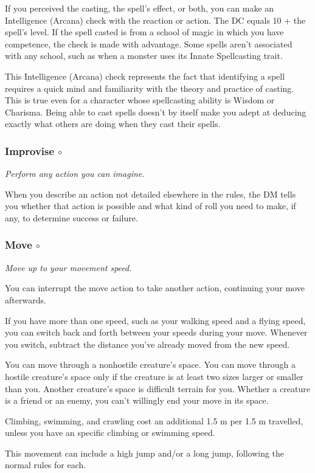     If you perceived the casting, the spell's effect, or both, you can make an Intelligence (Arcana) check with the reaction or action.
    The DC equals 10 + the spell's level.
    If the spell casted is from a school of magic in which you have competence, the check is made with advantage.
    Some spells aren't associated with any school, such as when a monster uses its Innate Spellcasting trait.

    This Intelligence (Arcana) check represents the fact that identifying a spell requires a quick mind and familiarity with the theory and practice of casting.
    This is true even for a character whose spellcasting ability is Wisdom or Charisma.
    Being able to cast spells doesn't by itself make you adept at deducing exactly what others are doing when they cast their spells.
\subsubsection{Improvise $\circ$} \label{act::improvise}
    \textit{Perform any action you can imagine.}

    When you describe an action not detailed elsewhere in the rules, the DM tells you whether that action is possible and what kind of roll you need to make, if any, to determine success or failure.
\subsubsection{Move $\circ$} \label{act::move}
    \textit{Move up to your movement speed.}

    You can interrupt the move action to take another action, continuing your move afterwards.

    If you have more than one speed, such as your walking speed and a flying speed, you can switch back and forth between your speeds during your move.
    Whenever you switch, subtract the distance you've already moved from the new speed.

    You can move through a nonhostile creature's space.
    You can move through a hostile creature's space only if the creature is at least two sizes larger or smaller than you.
    Another creature's space is difficult terrain for you.
    Whether a creature is a friend or an enemy, you can't willingly end your move in its space.

    Climbing, swimming, and crawling cost an additional 1.5 m per 1.5 m travelled, unless you have an specific climbing or swimming speed.

    This movement can include a high jump and/or a long jump, following the normal rules for each.
